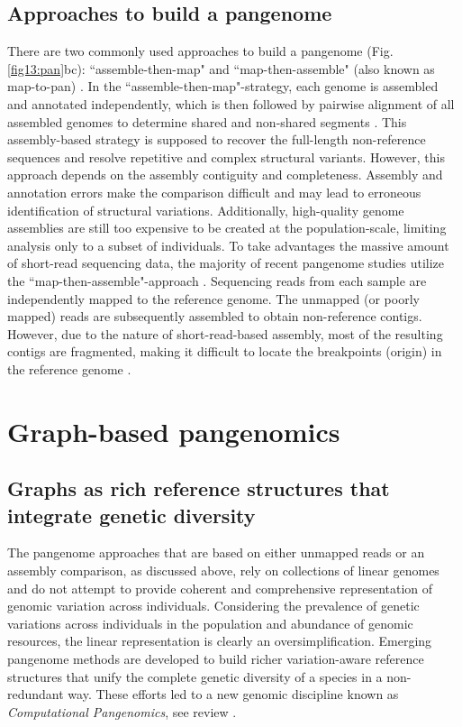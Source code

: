 \documentclass[../main.tex]{subfiles}
\begin{document}
\subsection*{Approaches to build a pangenome}
There are two commonly used approaches to build a pangenome (Fig. \ref{fig13:pan}bc): “assemble-then-map" and “map-then-assemble" (also known as map-to-pan) \citep{golicz2020pangenomics}. In the “assemble-then-map"-strategy, each genome is assembled and annotated independently, which is then followed by pairwise alignment of all assembled genomes to determine shared and non-shared segments \citep{duan2019hupan,li2019towards,eisfeldt2020discovery}. This assembly-based strategy is supposed to recover the full-length non-reference sequences and resolve repetitive and complex structural variants. However, this approach depends on the assembly contiguity and completeness. Assembly and annotation errors make the comparison difficult and may lead to erroneous identification of structural variations. Additionally, high-quality genome assemblies are still too expensive to be created at the population-scale, limiting analysis only to a subset of individuals. To take advantages the massive amount of short-read sequencing data, the majority of  recent pangenome studies utilize the “map-then-assemble"-approach \citep{holden2018assembly,laine2019exploring,sherman2019assembly}. Sequencing reads from each sample are independently mapped to the reference genome. The  unmapped (or poorly mapped) reads are subsequently assembled to obtain non-reference contigs. However, due to the nature of short-read-based assembly, most of the resulting contigs are fragmented, making it difficult to locate the breakpoints (origin) in the reference genome \citep{sherman2019assembly}. 

\section{Graph-based pangenomics}

\subsection*{Graphs as rich reference structures that integrate genetic diversity}

The pangenome approaches that are based on either unmapped reads or an assembly comparison, as discussed above, rely on collections of linear genomes and do not attempt to provide coherent and comprehensive representation of genomic variation across individuals. Considering the prevalence of genetic variations across individuals in the population and abundance of genomic resources, the linear representation is clearly an oversimplification. Emerging pangenome methods are developed to build richer variation-aware reference structures that unify the complete genetic diversity of a species in a non-redundant way. These efforts led to a new genomic discipline known as \emph{Computational Pangenomics}, see review \citep{paten2017genome,computational2018computational,eizenga2020pangenome}.
\end{document}

